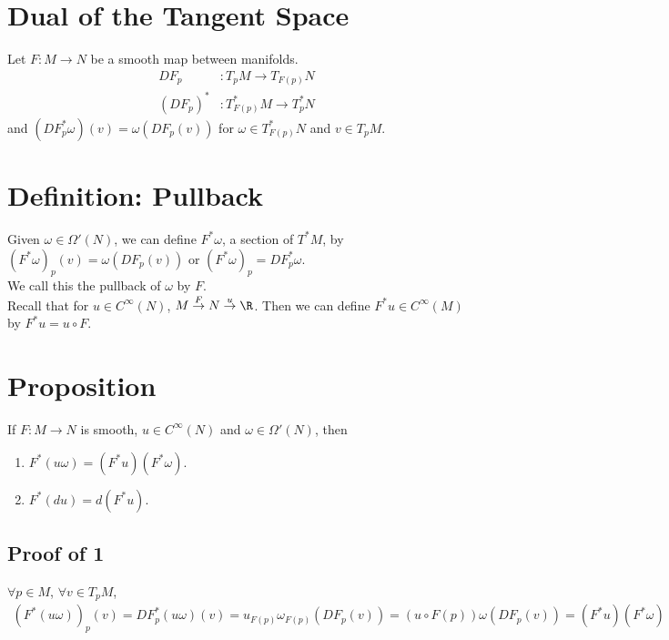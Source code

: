 \documentclass[11pt]{article}
\begin{document}
\section*{Dual of the Tangent Space}
\label{sec:org8e92da9}
Let \(F:M\to N\) be a smooth map between manifolds.\\
\begin{align*}
  DF_{p}&:T_{p}M\to T_{F(p)}N \\
  (DF_{p})^{*}&:T^{*}_{F(p)}M\to T^{*}_{p}N
\end{align*}
and \((DF_{p}^{*}\omega)(v)=\omega(DF_{p}(v))\) for \(\omega\in T^{*}_{F(p)}N\) and \(v\in T_{p}M\).\\
\section*{Definition: Pullback}
\label{sec:org6d07d88}
Given \(\omega\in\Omega'(N)\), we can define \(F^{*}\omega\), a section of \(T^{*}M\), by \((F^{*}\omega)_{p}(v)=\omega(DF_{p}(v))\) or \((F^{*}\omega)_{p}=DF^{*}_{p}\omega\).\\
We call this the pullback of \(\omega\) by \(F\).\\
Recall that for \(u\in C^{\infty}(N)\), \(M\overset{F}{\to}N\overset{u}{\to}\R\). Then we can define \(F^{*}u\in C^{\infty}(M)\) by \(F^{*}u=u\circ F\).\\
\section*{Proposition}
\label{sec:orgdaff8ba}
If \(F:M\to N\) is smooth, \(u\in C^{\infty}(N)\) and \(\omega\in\Omega'(N)\), then\\
\begin{enumerate}
\item \(F^{*}(u\omega)=(F^{*}u)(F^{*}\omega)\).\\
\item \(F^{*}(du)=d(F^{*}u)\).\\
\end{enumerate}
\subsection*{Proof of 1}
\label{sec:org60b551f}
\(\forall p\in M\), \(\forall v\in T_{p}M\),\\
\begin{align*}
  (F^{*}(u\omega))_{p}(v)
  =DF_{p}^{*}(u\omega)(v)
  =u_{F(p)}\omega_{F(p)}(DF_{p}(v))
  =(u\circ F(p))\omega(DF_{p}(v))
  =(F^{*}u)(F^{*}\omega)
\end{align*}
\end{document}
